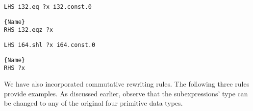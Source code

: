 \begin{minipage}{0.95\linewidth}
\begin{minipage}{0.49\linewidth}
    
    \lstset{
    language=ttt,
    style=watcode,
    basicstyle=\footnotesize\ttfamily,
    columns=fullflexible,
    breaklines=true}
    \begin{lstlisting}[]
LHS i32.eq ?x i32.const.0
            \end{lstlisting}\vspace{-0.5cm}
    \noindent\hrulefill
        \lstset{
            language=ttt,
            style=watcode,
            basicstyle=\footnotesize\ttfamily,
            columns=fullflexible,
            breaklines=true}
            \vspace{-0.2cm}
            \begin{lstlisting}[numbers=none]{Name}
RHS i32.eqz ?x
    \end{lstlisting}
\end{minipage}
\begin{minipage}{0.49\linewidth}
    \lstset{
    language=ttt,
    style=watcode,
    basicstyle=\footnotesize\ttfamily,
    columns=fullflexible,
    breaklines=true}
    \begin{lstlisting}[]
LHS i64.shl ?x i64.const.0
            \end{lstlisting}\vspace{-0.5cm}
    \noindent\hrulefill
        \lstset{
            language=ttt,
            style=watcode,
            basicstyle=\footnotesize\ttfamily,
            columns=fullflexible,
            breaklines=true}
            \vspace{-0.2cm}
            \begin{lstlisting}[numbers=none]{Name}
RHS ?x
    \end{lstlisting}
\end{minipage}    
\end{minipage}


We have also incorporated commutative rewriting rules. 
The following three rules provide examples. 
As discussed earlier, observe that the subexpressions' type can be changed to any of the original four primitive \Wasm data types.

